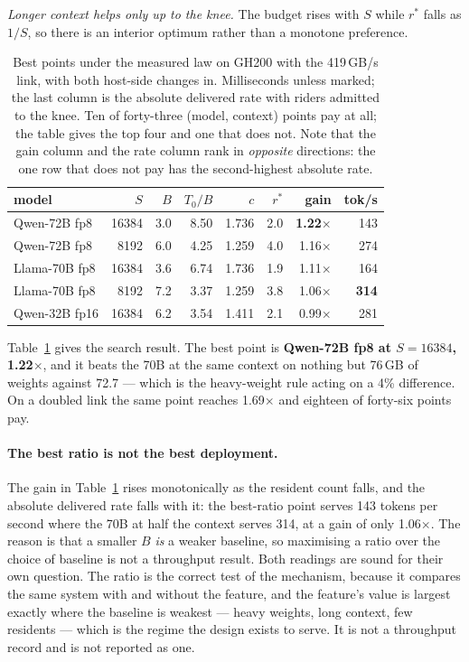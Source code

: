\emph{Longer context helps only up to the knee.} The budget rises with $S$ while
$r^{*}$ falls as $1/S$, so there is an interior optimum rather than a monotone
preference.

\begin{table}[t]
\centering
\small
\begin{tabular}{@{}lrrrrrrr@{}}
\toprule
model & $S$ & $B$ & $T_0/B$ & $c$ & $r^{*}$ & gain & tok/s \\
\midrule
Qwen-72B fp8   & 16384 & 3.0 & 8.50 & 1.736 & 2.0 & \textbf{1.22}$\times$ & 143 \\
Qwen-72B fp8   &  8192 & 6.0 & 4.25 & 1.259 & 4.0 & 1.16$\times$ & 274 \\
Llama-70B fp8  & 16384 & 3.6 & 6.74 & 1.736 & 1.9 & 1.11$\times$ & 164 \\
Llama-70B fp8  &  8192 & 7.2 & 3.37 & 1.259 & 3.8 & 1.06$\times$ & \textbf{314} \\
Qwen-32B fp16  & 16384 & 6.2 & 3.54 & 1.411 & 2.1 & 0.99$\times$ & 281 \\
\bottomrule
\end{tabular}
\caption{Best points under the measured law on GH200 with the 419\,GB/s link,
with both host-side changes in. Milliseconds unless marked; the last column is
the absolute delivered rate with riders admitted to the knee. Ten of
forty-three (model, context) points pay at all; the table gives the top four and
one that does not. Note that the gain column and the rate column rank in
\emph{opposite} directions: the one row that does not pay has the second-highest
absolute rate.}
\label{tab:overhead:bestmodel}
\end{table}

Table~\ref{tab:overhead:bestmodel} gives the search result. The best point is
\textbf{Qwen-72B fp8 at $S{=}16384$, 1.22$\times$}, and it beats the 70B at the
same context on nothing but 76\,GB of weights against 72.7 --- which is the
heavy-weight rule acting on a 4\% difference. On a doubled link the same point
reaches 1.69$\times$ and eighteen of forty-six points pay.

\paragraph{The best ratio is not the best deployment.} The gain in
Table~\ref{tab:overhead:bestmodel} rises monotonically as the resident count
falls, and the absolute delivered rate falls with it: the best-ratio point serves
143 tokens per second where the 70B at half the context serves 314, at a gain of
only 1.06$\times$. The reason is that a smaller $B$ \emph{is} a weaker baseline,
so maximising a ratio over the choice of baseline is not a throughput result.
Both readings are sound for their own question. The ratio is the correct test of
the mechanism, because it compares the same system with and without the feature,
and the feature's value is largest exactly where the baseline is weakest ---
heavy weights, long context, few residents --- which is the regime the design
exists to serve. It is not a throughput record and is not reported as one.


